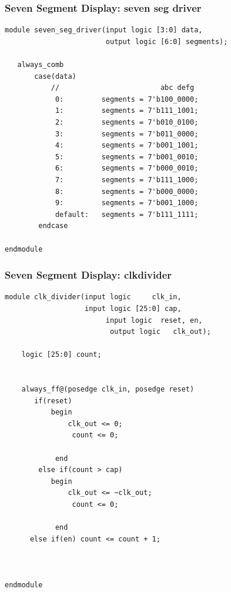 \documentclass[a4paper]{article}
\begin{document}
\subsubsection{Seven Segment Display: seven seg driver}
\begin{Verbatim}
module seven_seg_driver(input logic [3:0] data,
                        output logic [6:0] segments);
								
   always_comb
	   case(data)
		   //                        abc defg
			0:         segments = 7'b100_0000;
			1:         segments = 7'b111_1001;
			2:         segments = 7'b010_0100;
			3:         segments = 7'b011_0000;
			4:         segments = 7'b001_1001;
			5:         segments = 7'b001_0010;
			6:         segments = 7'b000_0010;
			7:         segments = 7'b111_1000;
			8:         segments = 7'b000_0000;
			9:         segments = 7'b001_1000;
			default:   segments = 7'b111_1111;
		endcase
	
endmodule 
\end{Verbatim}

\subsubsection{Seven Segment Display: clkdivider}
\begin{Verbatim}
module clk_divider(input logic     clk_in,
                   input logic [25:0] cap,
					    input logic  reset, en,
						 output logic   clk_out);
   							
	logic [25:0] count;						
   
	
	always_ff@(posedge clk_in, posedge reset)
	   if(reset) 
		   begin
			   clk_out <= 0;
				count <= 0;
			   
			end
		else if(count > cap)
		   begin
			   clk_out <= ~clk_out;
				count <= 0;
			
			end
      else if(en) count <= count + 1;
	
    

endmodule 

\end{Verbatim}
\end{document}

